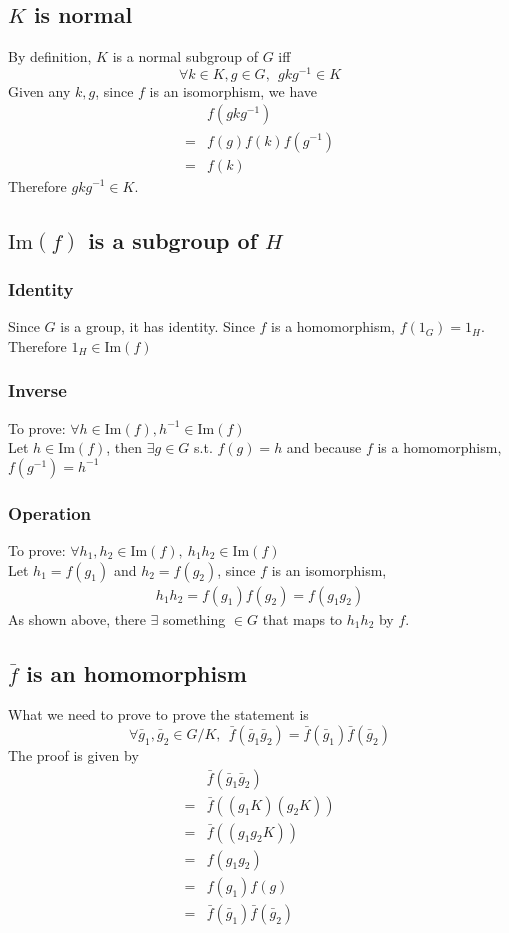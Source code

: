 \documentclass{article}
\renewcommand{\Im}{\text{Im}}
\begin{document}
	\subsection*{$K$ is normal}
	By definition, $K$ is a normal subgroup of $G$ iff $$
		\forall k\in K, g\in G,\ \ gkg^{-1}\in K
	$$
	Given any $k,g$, since $f$ is an isomorphism, we have\begin{align*}
		&f(gkg^{-1})\\
		=&f(g)f(k)f(g^{-1})\\
		=&f(k)
	\end{align*}
	Therefore $gkg^{-1}\in K$.
	\subsection*{$\Im(f)$ is a subgroup of $H$}
	\subsubsection*{Identity}
	Since $G$ is a group, it has identity. Since $f$ is a homomorphism, $f(1_G)=1_H$. Therefore $1_H\in\Im(f)$
	\subsubsection*{Inverse}
	To prove: $
		\forall h\in\Im(f), h^{-1}\in\Im(f)
	$\\
	Let $h\in\Im(f)$, then $\exists g\in G$ s.t. $f(g)=h$ and because $f$ is a homomorphism, $f(g^{-1})=h^{-1}$
	\subsubsection*{Operation}
	To prove: $
		\forall h_1,h_2\in\Im(f), \ h_1h_2\in\Im(f)
	$\\
	Let $h_1 = f(g_1)$ and $h_2 = f(g_2)$, since $f$ is an isomorphism, \begin{align*}
		h_1h_2 = f(g_1)f(g_2) = f(g_1g_2)
	\end{align*}
	As shown above, there $\exists$ something $\in G$ that maps to $h_1h_2$ by $f$.
	\subsection*{$\bar{f}$ is an homomorphism}
	What we need to prove to prove the statement is
	$$
		\forall \bar{g}_1,\bar{g}_2\in G/K,\ \ 
		\bar{f}(\bar{g}_1\bar{g}_2)=\bar{f}(\bar{g}_1)\bar{f}(\bar{g}_2)
	$$
	The proof is given by\begin{align*}
		&\bar{f}(\bar{g}_1\bar{g}_2)\\
		=&\bar{f}((g_1K)(g_2K))\\
		=&\bar{f}((g_1g_2K))\\
		=&f(g_1g_2)\\
		=&f(g_1)f(g)\\
		=&\bar{f}(\bar{g}_1)\bar{f}(\bar{g}_2)
	\end{align*}
\end{document}
